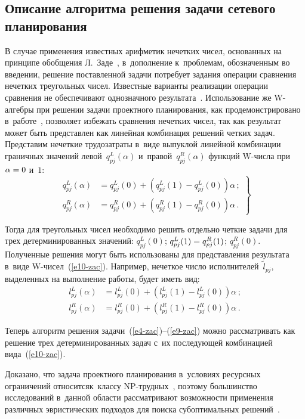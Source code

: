 \begin{multicols}{2}
\section{Описание алгоритма решения задачи сетевого 
планирования}
  
  В случае применения известных арифметик нечетких чисел, основанных на 
принципе обобщения Л.~Заде~\cite{5-zac}, в~дополнение к~проблемам, 
обозначенным во введении, решение поставленной задачи потребует задания 
операции сравнения нечетких треугольных чисел. Известные варианты 
реализации операции сравнения не обеспечивают однозначного 
результата~\cite{5-zac, 8-zac}. Использование же W-ал\-геб\-ры при решении 
задачи проектного планирования, как продемонстрировано  
в~работе~\cite{10-zac}, позволяет избежать сравнения нечетких чисел, так как 
результат может быть представлен как линейная комбинация решений четких 
задач. Представим нечеткие трудозатраты в~виде выпуклой линейной 
комбинации граничных значений левой~$q^L_{pj}(\alpha)$ 
и~правой~$q^R_{pj}(\alpha)$ функций W-чис\-ла при $\alpha\hm=0$ 
и~$1$:
  \begin{equation}
  \left.
  \begin{array}{rl}
  q^L_{pj}(\alpha)&= q^L_{pj}(0)+\left( q^L_{pj}(1)-q^L_{pj}(0)\right)\alpha\,;\\[6pt]
  q^R_{pj}(\alpha) &=q^R_{pj}(0) +\left( q^R_{pj}(1)-q^R_{pj}(0)\right)\alpha\,.
  \end{array}
  \right\}
  \label{e10-zac}
  \end{equation}
  
  Тогда для треугольных чисел необходимо решить отдельно четкие задачи для 
трех детерминированных значений:  $q^L_{pj}(0)$;
$q^L_{pj}(1)\hm=q^R_{pj}(1)$; $q^R_{pj}(0)$. Полученные 
решения могут быть использованы для представления результата в~виде  
W-чи\-сел~(\ref{e10-zac}). Например, нечеткое число 
исполнителей~$\tilde{l}_{pj}$, выделенных на выполнение работы, будет иметь 
вид:
  \begin{align*}
  l^L_{pj}(\alpha) &=l^L_{pj}(0) +\left( l^L_{pj}(1) - l^L_{pj}(0)\right)\alpha\,; 
\\
  l^R_{pj}(\alpha) &=l^R_{pj}(0)+\left( l^R_{pj}(1)-l^R_{pj}(0)\right)\alpha\,.
  \end{align*}
  
  Теперь алгоритм решения задачи~(\ref{e4-zac})--(\ref{e9-zac}) можно 
рассматривать как решение трех детерминированных задач с~их последующей 
комбинацией вида~(\ref{e10-zac}).
  
  Доказано, что задача проектного планирования в~условиях ресурсных 
ограничений относится\linebreak к~классу NP-труд\-ных~\cite{15-zac}, поэтому 
большинство исследований в~данной области рассматривают возможности 
применения различных эвристических подходов для поиска субоптимальных 
решений~\cite{16-zac}.
  

\end{multicols}
